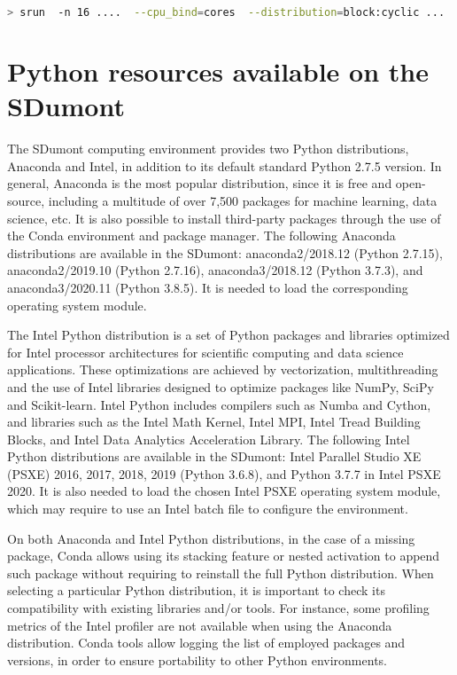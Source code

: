 \begin{lstlisting}[float=htb, language={Bash}, label={lst_bind}, caption={Excerpt of Slurm script.}, basicstyle=\scriptsize]
> srun  -n 16 ....  --cpu_bind=cores  --distribution=block:cyclic ...  [executable program] 
\end{lstlisting}

%
%
%
\section{Python resources available on the SDumont}

The SDumont computing environment provides two Python distributions, Anaconda and Intel, in addition to its default standard Python 2.7.5 version. In general, Anaconda is the most popular distribution, since it is free and open-source, including a multitude of over 7,500 packages for machine learning, data science, etc. It is also possible to install third-party packages through the use of the Conda environment and package manager. The following Anaconda distributions are available in the SDumont: anaconda2/2018.12 (Python 2.7.15), anaconda2/2019.10 (Python 2.7.16), anaconda3/2018.12 (Python 3.7.3), and anaconda3/2020.11 (Python 3.8.5). It is needed to load the corresponding operating system module.

The Intel Python distribution \cite {Cielo2019} is a set of Python packages and libraries optimized for Intel processor architectures for scientific computing and data science applications. These optimizations are achieved by vectorization, multithreading and the use of Intel libraries designed to optimize packages like NumPy, SciPy and Scikit-learn. Intel Python includes compilers such as Numba and Cython, and libraries such as the Intel Math Kernel, Intel MPI, Intel Tread Building Blocks, and Intel Data Analytics Acceleration Library. The following  Intel Python distributions are available in the SDumont: Intel Parallel Studio XE (PSXE) 2016, 2017, 2018, 2019 (Python 3.6.8), and Python 3.7.7 in Intel PSXE 2020. It is also needed to load the chosen Intel PSXE operating system module, which may require to use an Intel batch file to configure the environment. 

On both Anaconda and Intel Python distributions, in the case of a missing package, Conda allows using its stacking feature or nested activation to append such package without requiring to reinstall the full Python distribution. When selecting a particular Python distribution, it is important to check its compatibility with existing libraries and/or tools. For instance, some profiling metrics of the Intel profiler are not available when using the Anaconda distribution. Conda tools allow logging the list of employed packages and versions, in order to ensure portability to other Python environments.

